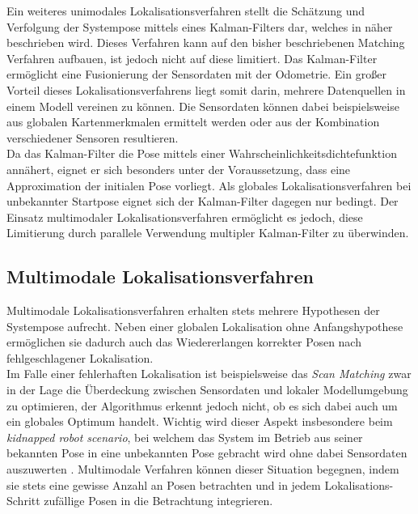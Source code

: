 Ein weiteres unimodales Lokalisationsverfahren stellt die Schätzung und Verfolgung der Systempose mittels eines Kalman-Filters dar, welches in  näher beschrieben wird. Dieses Verfahren kann auf den bisher beschriebenen Matching Verfahren aufbauen, ist jedoch nicht auf diese limitiert. Das Kalman-Filter ermöglicht eine Fusionierung der Sensordaten mit der Odometrie. Ein großer Vorteil dieses Lokalisationsverfahrens liegt somit darin, mehrere Datenquellen in einem Modell vereinen zu können. Die Sensordaten können dabei beispielsweise aus globalen Kartenmerkmalen ermittelt werden \cite{Leonard1991} oder aus der Kombination verschiedener Sensoren \cite{Roumeliotis1997} resultieren.\\
Da das Kalman-Filter die Pose mittels einer Wahrscheinlichkeitsdichtefunktion annähert, eignet er sich besonders unter der Voraussetzung, dass eine Approximation der initialen Pose vorliegt. Als globales Lokalisationsverfahren bei unbekannter Startpose eignet sich der Kalman-Filter dagegen nur bedingt. Der Einsatz multimodaler Lokalisationsverfahren ermöglicht es jedoch, diese Limitierung durch parallele Verwendung multipler Kalman-Filter zu überwinden.

\subsection{Multimodale Lokalisationsverfahren}
Multimodale Lokalisationsverfahren erhalten stets mehrere Hypothesen der Systempose aufrecht. Neben einer globalen Lokalisation ohne Anfangshypothese ermöglichen sie dadurch auch das Wiedererlangen korrekter Posen nach fehlgeschlagener Lokalisation.\\
Im Falle einer fehlerhaften Lokalisation ist beispielsweise das \textit{Scan Matching} zwar in der Lage die Überdeckung zwischen Sensordaten und lokaler Modellumgebung zu optimieren, der Algorithmus erkennt jedoch nicht, ob es sich dabei auch um ein globales Optimum handelt. Wichtig wird dieser Aspekt insbesondere beim \textit{kidnapped robot scenario}, bei welchem das System im Betrieb aus seiner bekannten Pose in eine unbekannten Pose gebracht wird ohne dabei Sensordaten auszuwerten \cite{Yic2011}. Multimodale Verfahren können dieser Situation begegnen, indem sie stets eine gewisse Anzahl an Posen betrachten und in jedem Lokalisations-Schritt zufällige Posen in die Betrachtung integrieren.\\

